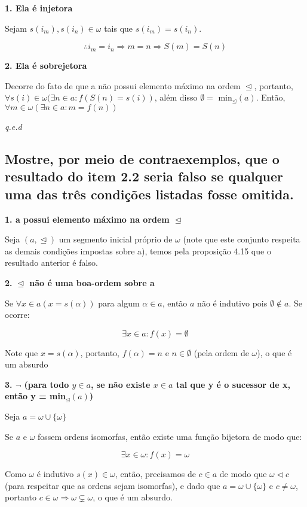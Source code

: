 \documentclass[12pt]{extarticle}
\newcommand{\fim}{\begin{flushright}

   \emph{q.e.d}
\end{flushright}}
\begin{document}
\textbf{1. Ela é injetora}

Sejam $s(i_m), s(i_n) \in \omega $ tais que $s(i_m) = s(i_n)$.

$$
\therefore i_m = i_n \Rightarrow m = n \Rightarrow S(m) = S(n)
$$



\textbf{2. Ela é sobrejetora}

Decorre do fato de que a não possui elemento máximo na ordem $\trianglelefteq$, portanto, $\forall s(i) \in \omega (\exists n \in a: f(S(n) = s(i))$, além disso $\emptyset =$ min$_{\trianglelefteq}(a)$. Então, $\forall m \in \omega (\exists n \in a : m = f(n))$

\fim

\subsection{Mostre, por meio de contraexemplos, que o resultado do item 2.2 seria falso se qualquer uma das três condições listadas fosse omitida.}

\textbf{1. a possui elemento máximo na ordem $\trianglelefteq$}

Seja $(a, \trianglelefteq)$ um segmento inicial próprio de $\omega$ (note que este conjunto respeita as demais condições impostas sobre a), temos pela proposição 4.15 que o resultado anterior é falso. 

\textbf{2. $\trianglelefteq$ não é uma boa-ordem sobre a}

Se $\forall x \in a (x = s(\alpha))$ para algum $\alpha \in a$, então $a$ não é indutivo pois $\emptyset \notin a$. Se ocorre:

$$
\exists x \in a : f(x) = \emptyset
$$

Note que $x = s(\alpha)$, portanto, $f(\alpha) = n$ e $n \in \emptyset$ (pela ordem de $\omega$), o que é um absurdo


\textbf{3. $\neg$ (para todo $y \in a$, se não existe $x \in a$ tal que y é o sucessor de x, então y = min$_{\trianglelefteq}(a)$)}

Seja $a = \omega \cup \{\omega\}$

Se $a$ e $\omega$ fossem ordens isomorfas, então existe uma função bijetora de modo que:

$$
\exists x \in \omega : f(x) = \omega
$$

Como $\omega$ é indutivo $s(x) \in \omega$, então, precisamos de $c \in a$ de modo que $\omega \triangleleft c$ (para respeitar que as ordens sejam isomorfas), e dado que $a = \omega \cup \{\omega\}$ e $c \neq \omega$, portanto $c \in \omega \Rightarrow \omega \subsetneq \omega$, o que é um absurdo.
\end{document}
